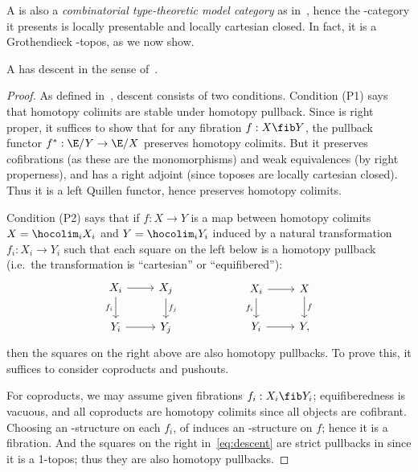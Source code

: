 A \ttmt is also a \emph{combinatorial type-theoretic model category} as in~\cite{gk:univlcc}, hence the \io-category it presents is locally presentable and locally cartesian closed.
In fact, it is a Grothendieck \io-topos, as we now show.

\begin{thm}\label{thm:descent}
  A \ttmt has descent in the sense of~\cite{rezk:homotopy-toposes}.
\end{thm}
\begin{proof}
  As defined in~\cite{rezk:homotopy-toposes}, descent consists of two conditions.
  Condition (P1) says that homotopy colimits are stable under homotopy pullback.
  Since \E is right proper, it suffices to show that for any fibration $f:X\fib Y$, the pullback functor $f^* : \E/Y \to \E/X$ preserves homotopy colimits.
  But it preserves cofibrations (as these are the monomorphisms) and weak equivalences (by right properness), and has a right adjoint (since toposes are locally cartesian closed).
  Thus it is a left Quillen functor, hence preserves homotopy colimits.

  Condition (P2) says that if $f:X\to Y$ is a map between homotopy colimits $X = \hocolim_i X_i$ and $Y = \hocolim_i Y_i$ induced by a natural transformation $f_i : X_i\to Y_i$ such that each square on the left below is a homotopy pullback (i.e.\ the transformation is ``cartesian'' or ``equifibered''):
  \begin{equation}
    \begin{tikzcd}
      X_i \ar[r] \ar[d,"f_i"'] & X_j \ar[d,"f_j"]\\
      Y_i \ar[r] & Y_j
    \end{tikzcd}
    \hspace{2cm}
    \begin{tikzcd}
      X_i \ar[r] \ar[d,"f_i"'] & X \ar[d,"f"]\\
      Y_i \ar[r] & Y,
    \end{tikzcd}\label{eq:descent}
  \end{equation}
  then the squares on the right above are also homotopy pullbacks.
  To prove this, it suffices to consider coproducts and pushouts. %

  For coproducts, we may assume given fibrations $f_i : X_i \fib Y_i$; equifiberedness is vacuous, and all coproducts are homotopy colimits since all objects are cofibrant.
  Choosing an \F-structure on each $f_i$, \locality of \F induces an \F-structure on $f$; hence it is a fibration.
  And the squares on the right in~\eqref{eq:descent} are strict pullbacks in \E since it is a 1-topos; thus they are also homotopy pullbacks.


\end{proof}
